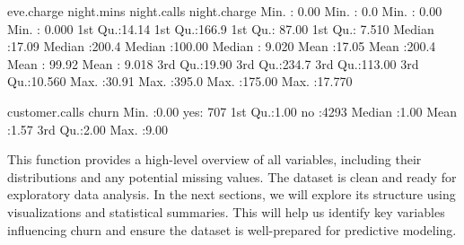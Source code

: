 \documentclass[
  11pt,
]{book}
\makeatletter
\newenvironment{Shaded}{}{}
\newcommand{\DecValTok}[1]{#1}
\newcommand{\FloatTok}[1]{#1}
\newcommand{\NormalTok}[1]{#1}
\newcommand{\SpecialCharTok}[1]{\textcolor[rgb]{0.39,0.39,0.39}{#1}}
\newenvironment{kframe}{%
\medskip{}
\setlength{\fboxsep}{.8em}
 \def\at@end@of@kframe{}%
 \ifinner\ifhmode%
  \def\at@end@of@kframe{\end{minipage}}%
  \begin{minipage}{\columnwidth}%
 \fi\fi%
 \def\FrameCommand##1{\hskip\@totalleftmargin \hskip-\fboxsep
 \colorbox{shadecolor}{##1}\hskip-\fboxsep
     \hskip-\linewidth \hskip-\@totalleftmargin \hskip\columnwidth}%
 \MakeFramed {\advance\hsize-\width
   \@totalleftmargin\z@ \linewidth\hsize
   \@setminipage}}%
 {\par\unskip\endMakeFramed%
 \at@end@of@kframe}
\renewenvironment{Shaded}{\begin{kframe}}{\end{kframe}}
\theoremstyle{definition}
\theoremstyle{definition}
\theoremstyle{definition}
\theoremstyle{definition}
\theoremstyle{remark}
\makeatother
\begin{document}
\begin{Shaded}
\begin{Highlighting}[]
\NormalTok{      eve.charge      night.mins     night.calls      night.charge   }
\NormalTok{    Min.   }\SpecialCharTok{:} \FloatTok{0.00}\NormalTok{   Min.   }\SpecialCharTok{:}  \FloatTok{0.0}\NormalTok{   Min.   }\SpecialCharTok{:}  \FloatTok{0.00}\NormalTok{   Min.   }\SpecialCharTok{:} \FloatTok{0.000}  
    \DecValTok{1}\NormalTok{st Qu.}\SpecialCharTok{:}\FloatTok{14.14}   \DecValTok{1}\NormalTok{st Qu.}\SpecialCharTok{:}\FloatTok{166.9}   \DecValTok{1}\NormalTok{st Qu.}\SpecialCharTok{:} \FloatTok{87.00}   \DecValTok{1}\NormalTok{st Qu.}\SpecialCharTok{:} \FloatTok{7.510}  
\NormalTok{    Median }\SpecialCharTok{:}\FloatTok{17.09}\NormalTok{   Median }\SpecialCharTok{:}\FloatTok{200.4}\NormalTok{   Median }\SpecialCharTok{:}\FloatTok{100.00}\NormalTok{   Median }\SpecialCharTok{:} \FloatTok{9.020}  
\NormalTok{    Mean   }\SpecialCharTok{:}\FloatTok{17.05}\NormalTok{   Mean   }\SpecialCharTok{:}\FloatTok{200.4}\NormalTok{   Mean   }\SpecialCharTok{:} \FloatTok{99.92}\NormalTok{   Mean   }\SpecialCharTok{:} \FloatTok{9.018}  
    \DecValTok{3}\NormalTok{rd Qu.}\SpecialCharTok{:}\FloatTok{19.90}   \DecValTok{3}\NormalTok{rd Qu.}\SpecialCharTok{:}\FloatTok{234.7}   \DecValTok{3}\NormalTok{rd Qu.}\SpecialCharTok{:}\FloatTok{113.00}   \DecValTok{3}\NormalTok{rd Qu.}\SpecialCharTok{:}\FloatTok{10.560}  
\NormalTok{    Max.   }\SpecialCharTok{:}\FloatTok{30.91}\NormalTok{   Max.   }\SpecialCharTok{:}\FloatTok{395.0}\NormalTok{   Max.   }\SpecialCharTok{:}\FloatTok{175.00}\NormalTok{   Max.   }\SpecialCharTok{:}\FloatTok{17.770}  
                                                                     
\NormalTok{    customer.calls churn     }
\NormalTok{    Min.   }\SpecialCharTok{:}\FloatTok{0.00}\NormalTok{   yes}\SpecialCharTok{:} \DecValTok{707}  
    \DecValTok{1}\NormalTok{st Qu.}\SpecialCharTok{:}\FloatTok{1.00}\NormalTok{   no }\SpecialCharTok{:}\DecValTok{4293}  
\NormalTok{    Median }\SpecialCharTok{:}\FloatTok{1.00}             
\NormalTok{    Mean   }\SpecialCharTok{:}\FloatTok{1.57}             
    \DecValTok{3}\NormalTok{rd Qu.}\SpecialCharTok{:}\FloatTok{2.00}             
\NormalTok{    Max.   }\SpecialCharTok{:}\FloatTok{9.00}             
   
\end{Highlighting}
\end{Shaded}

This function provides a high-level overview of all variables, including their distributions and any potential missing values. The dataset is clean and ready for exploratory data analysis. In the next sections, we will explore its structure using visualizations and statistical summaries. This will help us identify key variables influencing churn and ensure the dataset is well-prepared for predictive modeling.
\end{document}
